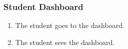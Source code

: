 \subsubsection{Student Dashboard}

\begin{enumerate}
    \item The student goes to the dashboard.
    \item The student sees the dashboard.
\end{enumerate}
